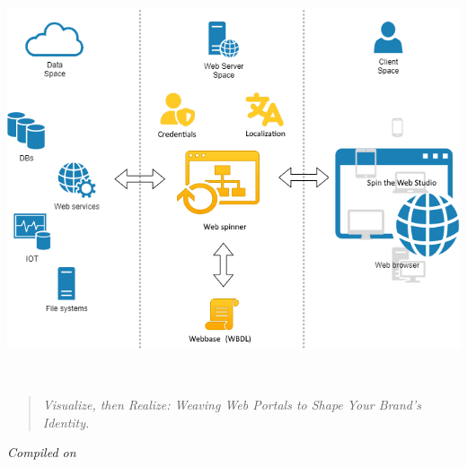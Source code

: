 \begin{titlepage}
\centering

\makeatletter
{\Huge\bfseries \@title\\[0.5cm]}

\ifx\@subtitle\@empty\else
{\Large \@subtitle\\[1.5cm]}
\fi

\vspace*{\fill}
\includegraphics[width=\textwidth]{figures/spin-the-web.png}
\vspace*{\fill}

{\large \organization\\[0.5cm]}

\begin{quote}
\centering
\textit{Visualize, then Realize: Weaving Web Portals to Shape Your Brand’s Identity.}
\end{quote}

\vspace{2em}
\begin{center}
    \textit{Compiled on \DTMnow}
\end{center}

\end{titlepage}
